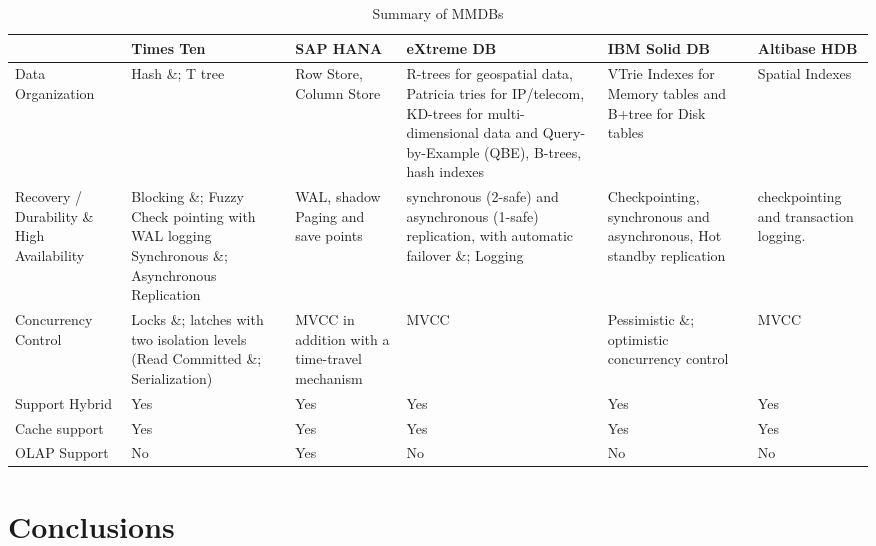 \documentclass[10pt]{article} %
\begin{document}
\begin{table}
\footnotesize
  \begin{center}
    \begin{tabular}{|p{2cm}|p{2cm}p{2cm}p{2cm}p{2cm}p{2cm}|}
      \hline
      & Times Ten & SAP HANA & eXtreme DB & IBM Solid DB & Altibase HDB \\
      \hline
      Data Organization
      &
      Hash \&; T tree
      &
      Row Store, Column Store
      &
      R-trees for geospatial data, Patricia tries for IP/telecom, KD-trees for multi-dimensional data and Query-by-Example (QBE), B-trees, hash indexes
      &
      VTrie Indexes for Memory tables and B+tree for Disk tables
      &
      Spatial Indexes \\
      \hline
      Recovery / Durability \& High Availability
      &
      Blocking \&; Fuzzy Check pointing with WAL logging Synchronous \&; Asynchronous Replication
      &
      WAL, shadow Paging and save points
      &
      synchronous (2-safe) and asynchronous (1-safe) replication, with automatic failover \&; Logging
      &
      Checkpointing, synchronous and asynchronous, Hot standby replication 
      &
      checkpointing and transaction logging. \\
      \hline
      Concurrency Control &Locks \&; latches with two isolation levels (Read Committed \&; Serialization)&MVCC in addition with a time-travel mechanism&MVCC&Pessimistic \&; optimistic concurrency control& MVCC \\
      \hline
      Support Hybrid&Yes&Yes&Yes&Yes&Yes \\
      \hline
      Cache support&Yes&Yes&Yes&Yes&Yes \\
      \hline
      OLAP Support
      &No&Yes&No&No&No \\
      \hline
      \end{tabular}
      \caption{Summary of MMDBs}
      \label{table:nonlin}
    \end{center}
  \end{table}
\normalsize



\section{Conclusions} 
\end{document}
